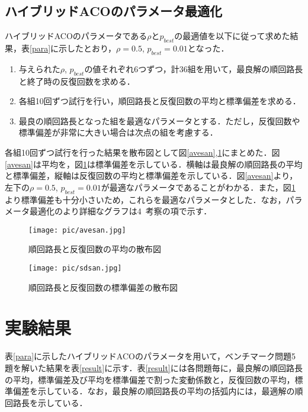 \documentclass[a4j]{jsarticle}
\begin{document}
\subsection{ハイブリッドACOのパラメータ最適化}
ハイブリッドACOのパラメータである$\rho$と$p_{best}$の最適値を以下に従って求めた結果，表\ref{para}に示したとおり，$\rho = 0.5$, $p_{best} = 0.01$となった．
\begin{enumerate}
 \item 与えられた$\rho$, $p_{best}$の値それぞれ6つずつ，計36組を用いて，最良解の順回路長と終了時の反復回数を求める．
 \item 各組10回ずつ試行を行い，順回路長と反復回数の平均と標準偏差を求める． 
 \item 最良の順回路長となった組を最適なパラメータとする．ただし，反復回数や標準偏差が非常に大きい場合は次点の組を考慮する．
\end{enumerate}

各組10回ずつ試行を行った結果を散布図として図\ref{avesan},\ref{sdsan}にまとめた．図\ref{avesan}は平均を，図\ref{sdsan}は標準偏差を示している．横軸は最良解の順回路長の平均と標準偏差，縦軸は反復回数の平均と標準偏差を示している．図\ref{avesan}より，左下の$\rho = 0.5$, $p_{best} = 0.01$が最適なパラメータであることがわかる．また，図\ref{sdsan}より標準偏差も十分小さいため，これらを最適なパラメータとした．なお，パラメータ最適化のより詳細なグラフは4\ 考察の項で示す．

\begin{figure}[H]
 \begin{minipage}{0.5\hsize}
  \begin{center}
   \texttt{[image: pic/avesan.jpg]}
  \end{center}
  \caption{順回路長と反復回数の平均の散布図}
  \label{avesan}
 \end{minipage}
 \begin{minipage}{0.5\hsize}
  \begin{center}
   \texttt{[image: pic/sdsan.jpg]}
  \end{center}
  \caption{順回路長と反復回数の標準偏差の散布図}
  \label{sdsan}
 \end{minipage}
\end{figure}


\section{実験結果}
表\ref{para}に示したハイブリッドACOのパラメータを用いて，ベンチマーク問題5題を解いた結果を表\ref{result}に示す．表\ref{result}には各問題毎に，最良解の順回路長の平均，標準偏差及び平均を標準偏差で割った変動係数と，反復回数の平均，標準偏差を示している．なお，最良解の順回路長の平均の括弧内には，最適解の順回路長を示している．
\end{document}
